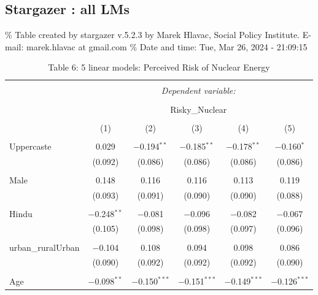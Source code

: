 \documentclass[
]{article}
\begin{document}
\newpage
\begin{landscape}

\hypertarget{stargazer-all-lms}{%
\section{Stargazer : all LMs}\label{stargazer-all-lms}}

\begingroup\setlength{\tabcolsep}{1pt}\renewcommand{\arraystretch}{0.7}

\% Table created by stargazer v.5.2.3 by Marek Hlavac, Social Policy
Institute. E-mail: marek.hlavac at gmail.com \% Date and time: Tue, Mar
26, 2024 - 21:09:15

\begin{table}[!htbp] \centering 
  \caption{Table 6: 5 linear models: Perceived Risk of Nuclear Energy} 
  \label{} 
\begin{tabular}{@{\extracolsep{5pt}}lccccc} 
\\[-1.8ex]\hline 
\hline \\[-1.8ex] 
 & \multicolumn{5}{c}{\textit{Dependent variable:}} \\ 
\cline{2-6} 
\\[-1.8ex] & \multicolumn{5}{c}{Risky\_Nuclear} \\ 
\\[-1.8ex] & (1) & (2) & (3) & (4) & (5)\\ 
\hline \\[-1.8ex] 
 Uppercaste & 0.029 & $-$0.194$^{**}$ & $-$0.185$^{**}$ & $-$0.178$^{**}$ & $-$0.160$^{*}$ \\ 
  & (0.092) & (0.086) & (0.086) & (0.086) & (0.086) \\ 
  & & & & & \\ 
 Male & 0.148 & 0.116 & 0.116 & 0.113 & 0.119 \\ 
  & (0.093) & (0.091) & (0.090) & (0.090) & (0.088) \\ 
  & & & & & \\ 
 Hindu & $-$0.248$^{**}$ & $-$0.081 & $-$0.096 & $-$0.082 & $-$0.067 \\ 
  & (0.105) & (0.098) & (0.098) & (0.097) & (0.096) \\ 
  & & & & & \\ 
 urban\_ruralUrban & $-$0.104 & 0.108 & 0.094 & 0.098 & 0.086 \\ 
  & (0.090) & (0.092) & (0.092) & (0.092) & (0.090) \\ 
  & & & & & \\ 
 Age & $-$0.098$^{**}$ & $-$0.150$^{***}$ & $-$0.151$^{***}$ & $-$0.149$^{***}$ & $-$0.126$^{***}$ \\ 

\end{tabular}
\end{table}
\end{landscape}
\end{document}
